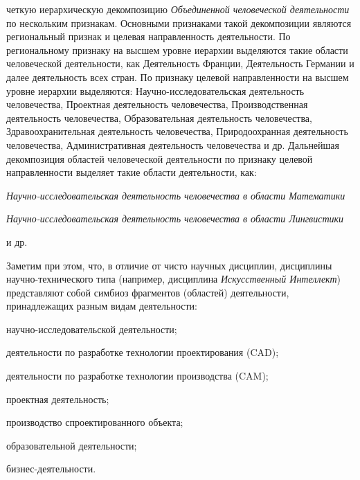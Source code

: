 \begin{scnsubstruct}
{\begin{scnitemize}
            \item четкую иерархическую декомпозицию \textit{Объединенной человеческой деятельности} по нескольким признакам. Основными признаками такой декомпозиции являются региональный признак и целевая направленность деятельности. По региональному признаку на высшем уровне иерархии выделяются такие области человеческой деятельности, как Деятельность Франции, Деятельность Германии и далее деятельность всех стран. По признаку целевой направленности на высшем уровне иерархии выделяются: Научно-исследовательская деятельность человечества, Проектная деятельность человечества, Производственная деятельность человечества, Образовательная деятельность человечества, Здравоохранительная деятельность человечества, Природоохранная деятельность человечества, Административная деятельность человечества и др. Дальнейшая декомпозиция областей человеческой деятельности по признаку целевой направленности выделяет такие области деятельности, как:
            \begin{scnitemizeii}
                \item \textit{Научно-исследовательская деятельность человечества в области Математики}
                \item \textit{Научно-исследовательская деятельность человечества в области Лингвистики}
                \item и др.
            \end{scnitemizeii}
            Заметим при этом, что, в отличие от чисто научных дисциплин, дисциплины научно-технического типа (например, дисциплина \textit{Искусственный Интеллект}) представляют собой симбиоз фрагментов (областей) деятельности, принадлежащих разным видам деятельности:
            \begin{scnitemizeii}
                \item научно-исследовательской деятельности;
                \item деятельности по разработке технологии проектирования (CAD);
                \item деятельности по разработке технологии производства (CAM);
                \item проектная деятельность;
                \item производство спроектированного объекта;
                \item образовательной деятельности;
                \item бизнес-деятельности.
            \end{scnitemizeii}

\end{scnitemize}}
\end{scnsubstruct}
